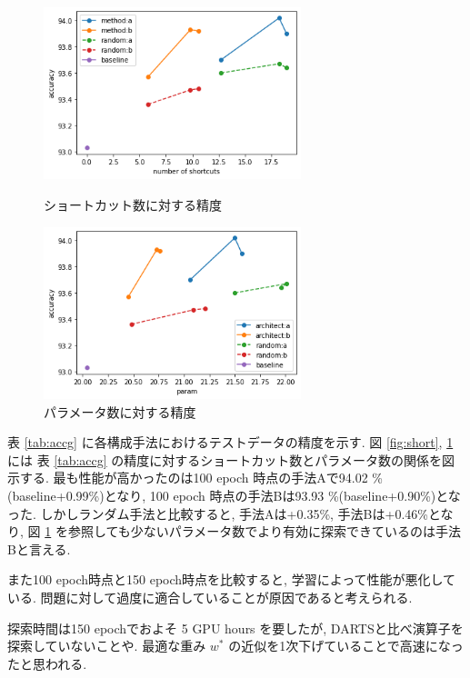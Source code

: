 \documentclass[twocolumn]{jarticle}     %
\begin{document}
\begin{figure}[tb]
 \begin{minipage}{0.5\hsize}
 	\begin{center}
 		\includegraphics[clip,width=75mm]{short.png}
 		\caption{ショートカット数に対する精度}
 		\label{fig:short}
 	\end{center}
 \end{minipage}
 \begin{minipage}{0.5\hsize}
 	\begin{center}
    \includegraphics[clip,width=75mm]{param.png}
    \caption{パラメータ数に対する精度}
    \label{fig:param}
 	\end{center}
 \end{minipage}
\end{figure}


表 \ref{tab:accg} に各構成手法におけるテストデータの精度を示す.
図 \ref{fig:short}, \ref{fig:param} には
表 \ref{tab:accg} の精度に対するショートカット数とパラメータ数の関係を図示する.
最も性能が高かったのは100 epoch 時点の手法Aで94.02 \%(baseline+0.99\%)となり,
100 epoch 時点の手法Bは93.93 \%(baseline+0.90\%)となった.
しかしランダム手法と比較すると, 手法Aは+0.35\%, 手法Bは+0.46\%となり,
図 \ref{fig:param} を参照しても少ないパラメータ数でより有効に探索できているのは手法Bと言える.

また100 epoch時点と150 epoch時点を比較すると, 学習によって性能が悪化している.
問題に対して過度に適合していることが原因であると考えられる.

探索時間は150 epochでおよそ 5 GPU hours を要したが, DARTSと比べ演算子を探索していないことや.
最適な重み $w^*$ の近似を1次下げていることで高速になったと思われる.
\end{document}
